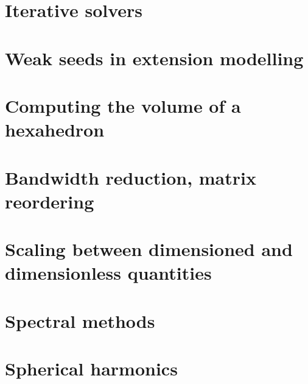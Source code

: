 \section{Iterative solvers \label{ss:itsolvers}}  %
\newpage %
\section{Weak seeds in extension modelling \label{ss:weakseeds}}  %
\newpage %
\section{Computing the volume of a hexahedron \label{ss:vol_hexahed}}  %
\newpage %
\section{Bandwidth reduction, matrix reordering}  %
\newpage %
\section{Scaling between dimensioned and dimensionless quantities}  %
\newpage %
\section{Spectral methods} 


\newpage %
\section{Spherical harmonics} %

